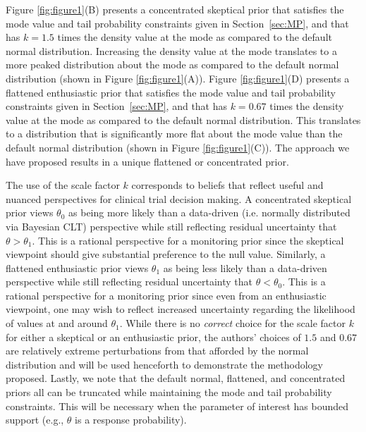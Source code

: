 \documentclass[12pt]{article}
\begin{document}
{Figure \ref{fig:figure1}(B) presents a concentrated skeptical prior that satisfies 
the mode value and tail probability constraints given in Section~\ref{sec:MP}, and that has $k=1.5$ times the density value at the mode as compared to the default normal distribution. 
Increasing the density value at the mode translates to a more peaked distribution about the mode as compared to the default normal distribution (shown in Figure \ref{fig:figure1}(A)). 
%
Figure \ref{fig:figure1}(D) presents a flattened enthusiastic prior that satisfies the mode value and tail probability constraints given in Section~\ref{sec:MP}, and
that has $k=0.67$ times the density value at the mode as compared to the default normal distribution. This translates to a distribution that is significantly more flat about the mode value than the default normal distribution (shown in Figure \ref{fig:figure1}(C)). 
%
%
The approach we have proposed results in a unique flattened or concentrated prior.

The use of the scale factor $k$ corresponds to beliefs that reflect useful and nuanced perspectives for clinical trial decision making.
%
A concentrated skeptical prior views $\theta_0$ as being more likely than a data-driven (i.e. normally distributed via Bayesian CLT) perspective while still reflecting residual uncertainty that $\theta>\theta_1$.
%
This is a rational perspective for a monitoring prior since the skeptical viewpoint should give substantial preference to the null value.
%
Similarly, a flattened enthusiastic prior views $\theta_1$ as being less likely than a data-driven perspective while still reflecting residual uncertainty that $\theta<\theta_0$.
%
This is a rational perspective for a monitoring prior since even from an enthusiastic viewpoint, one may wish to reflect increased uncertainty regarding the likelihood of values at and around $\theta_1$.
%
While there is no \textit{correct} choice for the scale factor $k$ for either a skeptical or an enthusiastic prior, the authors' choices
of $1.5$ and $0.67$ are relatively extreme perturbations from that afforded by the normal distribution and will be used henceforth to 
demonstrate the methodology proposed. 
Lastly, we note that the default normal, flattened, and concentrated priors all can be truncated while maintaining the mode and tail 
probability constraints.
This will be necessary when the parameter of interest has bounded support (e.g., $\theta$ is a response probability).
}
\end{document}
